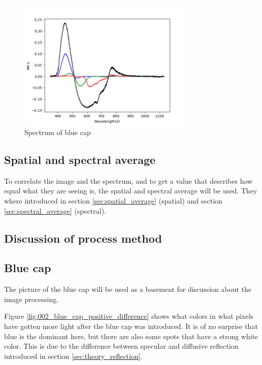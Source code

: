 \begin{figure}[h]
    \centering
    \includegraphics[width=0.75\textwidth]{Plots/blue_cap_rr_minus_one_with_qe.png}    
    \caption{Spectrum of blue cap}
    \label{fig:blue_cap_spectrum}
\end{figure}

\subsection{Spatial and spectral average}
\label{sec:spatial_and_spectral_average}

To correlate the image and the spectrum, and to get a value that describes how equal what they are seeing is, the spatial and spectral average will be used. They where introduced in section \ref{sec:spatial_average} (spatial) and section \ref{sec:spectral_average} (spectral). %

\subsection{Discussion of process method}

\subsection{Blue cap}
\label{sec:blue_cap_discussion}
The picture of the blue cap will be used as a basement for discussion about the image processing. 

Figure \ref{fig:002_blue_cap_positive_difference} shows what colors in what pixels have gotten more light after the blue cap was introduced. It is of no surprise that blue is the dominant here, but there are also some spots that have a strong white color. This is due to the difference between specular and diffusive reflection introduced in section \ref{sec:theory_reflection}. 

